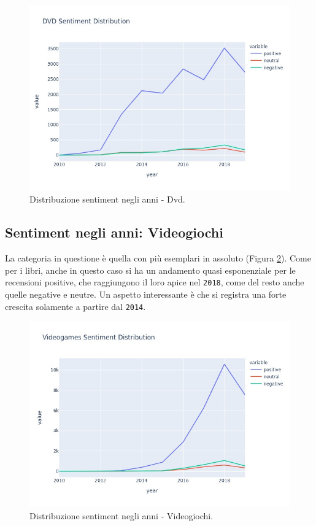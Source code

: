 			\begin{figure} [h]
				\includegraphics[width=\textwidth]{Figure/sent_year_dvd}
				\caption{Distribuzione sentiment negli anni - Dvd.}
				\label{fig:sent_year_dvd}
			\end{figure}
		
			\subsection{Sentiment negli anni: Videogiochi}
				La categoria in questione è quella con più esemplari in assoluto (Figura \ref{fig:sent_year_videogames}). Come per i libri, anche in questo caso si ha un andamento quasi esponenziale per le recensioni positive, che raggiungono il loro apice nel \verb|2018|, come del resto anche quelle negative e neutre. Un aspetto interessante è che si registra una forte crescita solamente a partire dal \verb|2014|.
				
			\begin{figure} [h]
				\includegraphics[width=\textwidth]{Figure/sent_year_videogames}
				\caption{Distribuzione sentiment negli anni - Videogiochi.}
				\label{fig:sent_year_videogames}
			\end{figure}
		
